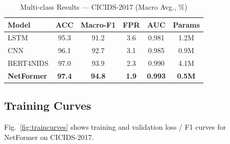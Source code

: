 \documentclass[conference]{IEEEtran}
\begin{document}
\begin{table}[h]
	\caption{Multi-class Results --- CICIDS-2017 (Macro Avg., \%)}
	\label{tab:cicids}
	\centering
	\renewcommand{\arraystretch}{1.15}
	\begin{tabular}{@{}lccccc@{}}
		\toprule
		\textbf{Model}     & \textbf{ACC}  & \textbf{Macro-F1}
		                   & \textbf{FPR}  & \textbf{AUC}      & \textbf{Params}                \\
		\midrule
		LSTM               & 95.3          & 91.2              & 3.6             & 0.981 & 1.2M \\
		CNN                & 96.1          & 92.7              & 3.1             & 0.985 & 0.9M \\
		BERT4NIDS          & 97.0          & 93.9              & 2.3             & 0.990 & 4.1M \\
		\textbf{NetFormer} & \textbf{97.4} & \textbf{94.8}
		                   & \textbf{1.9}  & \textbf{0.993}    & \textbf{0.5M}                  \\
		\bottomrule
	\end{tabular}
\end{table}

\subsection{Training Curves}
\label{sec:curves}

Fig.~\ref{fig:traincurves} shows training and validation loss / F1
curves for NetFormer on CICIDS-2017.
\end{document}
